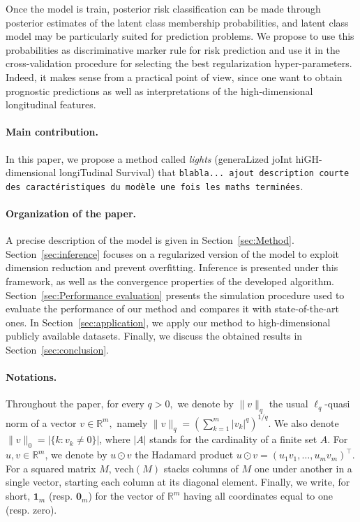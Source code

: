 \documentclass[11pt]{article}
\newcommand{\norm}[1]{\|#1\|}
\newcommand{\R}{\mathds R}
\begin{document}
Once the model is train, posterior risk classification can be made through posterior estimates of the latent class membership probabilities, and latent class model may be particularly suited for prediction problems. We propose to use this probabilities as discriminative marker rule for risk prediction and use it in the cross-validation procedure for selecting the best regularization hyper-parameters. Indeed, it makes sense from a practical point of view, since one want to obtain prognostic predictions as well as interpretations of the high-dimensional longitudinal features.


\paragraph{Main contribution.} 

In this paper, we propose a method called \textit{lights} (generaLized joInt hiGH-dimensional longiTudinal Survival) that \texttt{blabla... ajout description courte des caractéristiques du modèle une fois les maths terminées}.


\paragraph{Organization of the paper.}

A precise description of the model is given in Section~\ref{sec:Method}.
Section~\ref{sec:inference} focuses on a regularized version of the
model to exploit dimension reduction and prevent overfitting. Inference is
presented under this framework, as well as the convergence properties of the developed algorithm.
Section~\ref{sec:Performance evaluation} presents the simulation procedure used to evaluate the performance of our method and compares it with state-of-the-art ones. In Section~\ref{sec:application}, we apply our method to high-dimensional publicly available datasets. Finally, we discuss the obtained results in Section~\ref{sec:conclusion}.

\paragraph{Notations.}

Throughout the paper, for every $q > 0,$ we denote by $\norm{v}_q$ the usual $\ell_q$-quasi norm of a vector $v \in \R^m,$ namely
 $\norm{v}_q =(\sum_{k=1}^m|v_k|^q)^{1/q}$. We also denote $\norm{v}_0 = |\{k : v_k \neq 0\}|$, where $|A|$ stands for the cardinality of a finite set $A$.
 For $u, v \in \R^m$, we denote by $u \odot v$ the Hadamard product $u\odot v =(u_1v_1, \ldots, u_mv_m)^\top.$ 
For a squared matrix $M$, $\text{vech}(M)$ stacks columns of $M$ one under another in a single vector, starting each column at its diagonal element.
Finally, we write, for short, $\mathbf{1}_m$  (resp. $\mathbf{0}_m$) for the vector of $\R^m$ having all coordinates equal to one (resp. zero).
\end{document}

